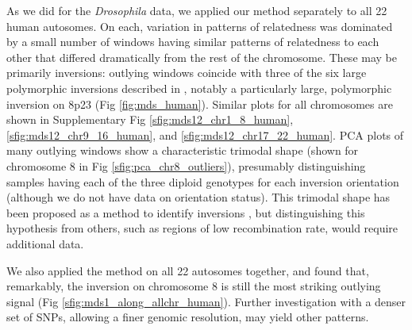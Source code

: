 \documentclass[11pt, oneside]{article}   	%
\newcommand\citet{\cite}
\newcommand\citep{\cite}
\newcommand{\Figure}{Fig }
\newcommand{\Figures}{Fig }
\newcommand{\Figure}{{Figure }}
\newcommand{\Figures}{{Figures }}
\begin{document}
As we did for the \textit{Drosophila} data, we applied our method separately to all 22 human autosomes.
On each, variation in patterns of relatedness was dominated by a small number of windows
having similar patterns of relatedness to each other that differed dramatically from the rest of the chromosome.
These may be primarily inversions: outlying windows coincide with
three of the six large polymorphic inversions described in \citet{antonacci2009characterization},
notably a particularly large, polymorphic inversion on 8p23 (\Figure \ref{fig:mds_human}). 
Similar plots for all chromosomes are shown
in Supplementary \Figures \ref{sfig:mds12_chr1_8_human}, \ref{sfig:mds12_chr9_16_human}, and \ref{sfig:mds12_chr17_22_human}.
PCA plots of many outlying windows show a characteristic trimodal shape 
(shown for chromosome 8 in \Figure \ref{sfig:pca_chr8_outliers}),
presumably distinguishing samples having each of the three diploid genotypes for each inversion orientation
(although we do not have data on orientation status).
This trimodal shape has been proposed as a method to identify inversions \citep{ma2012investigation},
but distinguishing this hypothesis from others,
such as regions of low recombination rate,
would require additional data.

We also applied the method on all 22 autosomes together, 
and found that, remarkably, 
the inversion on chromosome 8 is still the most striking outlying signal (\Figure \ref{sfig:mds1_along_allchr_human}). 
Further investigation with a denser set of SNPs,
allowing a finer genomic resolution,
may yield other patterns.
\end{document}
